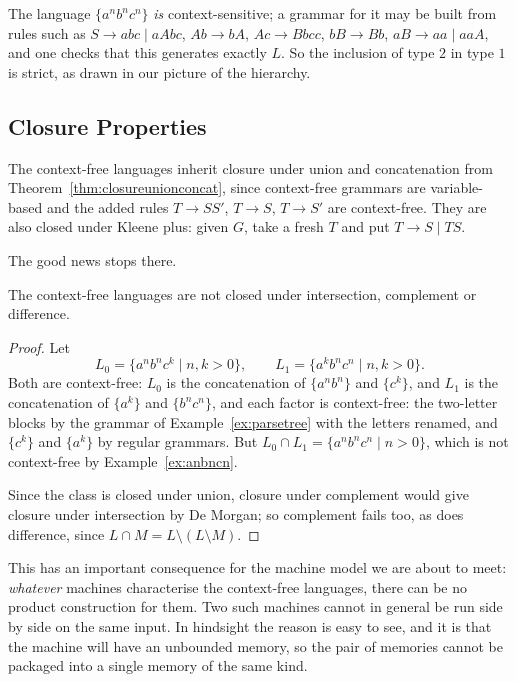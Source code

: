 \documentclass[a4paper]{scrartcl}
\begin{document}
\begin{remark}
	The language $\{a^nb^nc^n\}$ \emph{is} context-sensitive; a grammar for it may be built from rules such as $S \to abc \mid aAbc$, $Ab \to bA$, $Ac \to Bbcc$, $bB \to Bb$, $aB \to aa \mid aaA$, and one checks that this generates exactly $L$. So the inclusion of type $2$ in type $1$ is strict, as drawn in our picture of the hierarchy.
\end{remark}

\subsection{Closure Properties}

The context-free languages inherit closure under union and concatenation from Theorem~\ref{thm:closureunionconcat}, since context-free grammars are variable-based and the added rules $T \to SS'$, $T \to S$, $T \to S'$ are context-free. They are also closed under Kleene plus: given $G$, take a fresh $T$ and put $T \to S \mid TS$.

The good news stops there.

\begin{proposition}\label{prop:cfnotintersection}
	The context-free languages are not closed under intersection, complement or difference.
\end{proposition}

\begin{proof}
	Let
	$$L_0 = \{a^nb^nc^k \mid n,k > 0\}, \qquad L_1 = \{a^kb^nc^n \mid n,k > 0\}.$$
	Both are context-free: $L_0$ is the concatenation of $\{a^nb^n\}$ and $\{c^k\}$, and $L_1$ is the concatenation of $\{a^k\}$ and $\{b^nc^n\}$, and each factor is context-free: the two-letter blocks by the grammar of Example~\ref{ex:parsetree} with the letters renamed, and $\{c^k\}$ and $\{a^k\}$ by regular grammars. But $L_0 \cap L_1 = \{a^nb^nc^n \mid n > 0\}$, which is not context-free by Example~\ref{ex:anbncn}.

	Since the class is closed under union, closure under complement would give closure under intersection by De Morgan; so complement fails too, as does difference, since $L \cap M = L \setminus (L \setminus M)$.
\end{proof}

This has an important consequence for the machine model we are about to meet: \emph{whatever} machines characterise the context-free languages, there can be no product construction for them. Two such machines cannot in general be run side by side on the same input. In hindsight the reason is easy to see, and it is that the machine will have an unbounded memory, so the pair of memories cannot be packaged into a single memory of the same kind.
\end{document}
